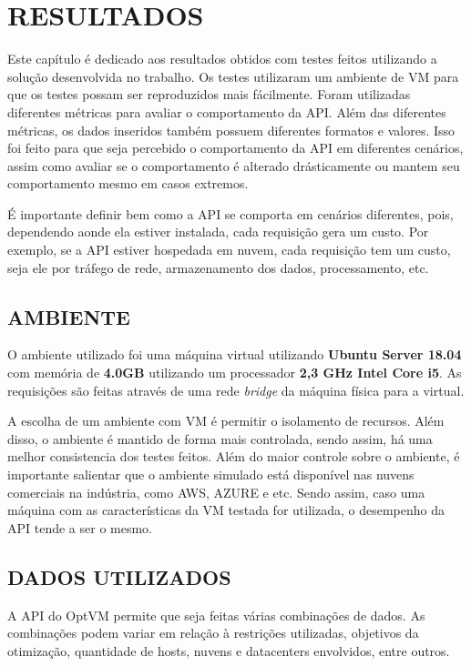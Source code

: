 \chapter{RESULTADOS}
\label{chap:results}

Este capítulo é dedicado aos resultados obtidos com testes
feitos utilizando a solução desenvolvida no trabalho. Os testes
utilizaram um ambiente de VM para que os testes possam ser reproduzidos 
mais fácilmente. Foram utilizadas diferentes métricas para avaliar
o comportamento da API. Além das diferentes métricas, os dados inseridos 
também possuem diferentes formatos e valores. Isso foi feito para que 
seja percebido o comportamento da API em diferentes cenários, assim como
avaliar se o comportamento é alterado drásticamente ou mantem seu comportamento
mesmo em casos extremos.

É importante definir bem como a API se comporta em cenários diferentes, pois,
dependendo aonde ela estiver instalada, cada requisição gera um custo. Por exemplo, se a API 
estiver hospedada em nuvem, cada requisição tem um custo, seja ele por tráfego de
rede, armazenamento dos dados, processamento, etc. 

\section{AMBIENTE}

O ambiente utilizado foi uma máquina virtual utilizando \textbf{Ubuntu Server 18.04}
com memória de \textbf{4.0GB} utilizando um processador \textbf{2,3 GHz Intel Core i5}. 
As requisições são feitas através de uma rede \textit{bridge} da máquina física para a virtual.

A escolha de um ambiente com VM é permitir o isolamento de recursos. Além disso,
o ambiente é mantido de forma mais controlada, sendo assim, há uma melhor 
consistencia dos testes feitos. Além do maior controle sobre o ambiente, é importante salientar 
que o ambiente simulado está disponível nas nuvens comerciais na indústria, como AWS, AZURE e 
etc. Sendo assim, caso uma máquina com as características da VM testada for utilizada, 
o desempenho da API tende a ser o mesmo.

\section{DADOS UTILIZADOS}
A API do OptVM permite que seja feitas várias combinações de dados. As combinações
podem variar em relação à restrições utilizadas, objetivos da otimização, quantidade
de hosts, nuvens e datacenters envolvidos, entre outros. 

